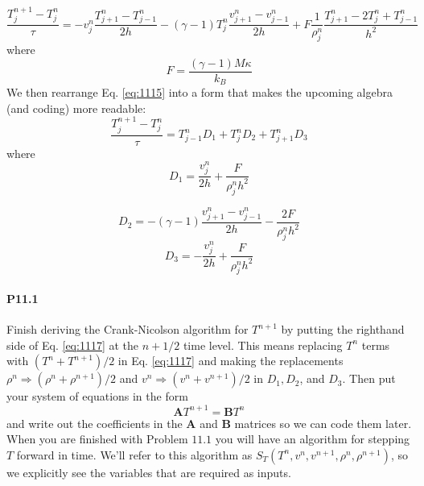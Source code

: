 \begin{equation}\label{eq:1115}
\frac{T_{j}^{n+1}-T_{j}^{n}}{\tau}=-v_{j}^{n} \frac{T_{j+1}^{n}-T_{j-1}^{n}}{2 h}-(\gamma-1) T_{j}^{n} \frac{v_{j+1}^{n}-v_{j-1}^{n}}{2 h}+F \frac{1}{\rho_{j}^{n}} \frac{T_{j+1}^{n}-2 T_{j}^{n}+T_{j-1}^{n}}{h^{2}}
\end{equation}
where
\begin{equation}\label{eq:1116}
F=\frac{(\gamma-1) M \kappa}{k_{B}}
\end{equation}
We then rearrange Eq. \eqref{eq:1115} into a form that makes the upcoming algebra (and
coding) more readable:
\begin{equation}\label{eq:1117}
\frac{T_{j}^{n+1}-T_{j}^{n}}{\tau}=T_{j-1}^{n} D_{1}+T_{j}^{n} D_{2}+T_{j+1}^{n} D_{3}
\end{equation}
where
\begin{equation}\label{eq:1118}
D_{1}=\frac{v_{j}^{n}}{2 h}+\frac{F}{\rho_{j}^{n} h^{2}}
\end{equation}

\begin{equation}\label{eq:1119}
D_{2}=-(\gamma-1) \frac{v_{j+1}^{n}-v_{j-1}^{n}}{2 h}-\frac{2 F}{\rho_{j}^{n} h^{2}}
\end{equation}
\begin{equation}\label{eq:1120}
D_{3}=-\frac{v_{j}^{n}}{2 h}+\frac{F}{\rho_{j}^{n} h^{2}}
\end{equation}
\paragraph*{P11.1}
Finish deriving the Crank-Nicolson algorithm for $T^{n+1}$ by putting the righthand side of Eq. \eqref{eq:1117} at the $n+1 / 2$ time level. This means replacing $T^{n}$ terms with $\left(T^{n}+T^{n+1}\right) / 2$ in Eq. \eqref{eq:1117} and making the replacements $\rho^{n} \Rightarrow\left(\rho^{n}+\rho^{n+1}\right) / 2$ and $v^{n} \Rightarrow\left(v^{n}+v^{n+1}\right) / 2$ in $D_{1}, D_{2}$, and $D_{3}$. Then put your system of equations in the form
\begin{equation*}
\mathbf{A} T^{n+1}=\mathbf{B} T^{n}
\end{equation*}
and write out the coefficients in the $\mathbf{A}$ and $\mathbf{B}$ matrices so we can code them later.
When you are finished with Problem $11.1$ you will have an algorithm for stepping $T$ forward in time. We'll refer to this algorithm as $S_{T}\left(T^{n}, v^{n}, v^{n+1}, \rho^{n}, \rho^{n+1}\right)$, so we explicitly see the variables that are required as inputs.
